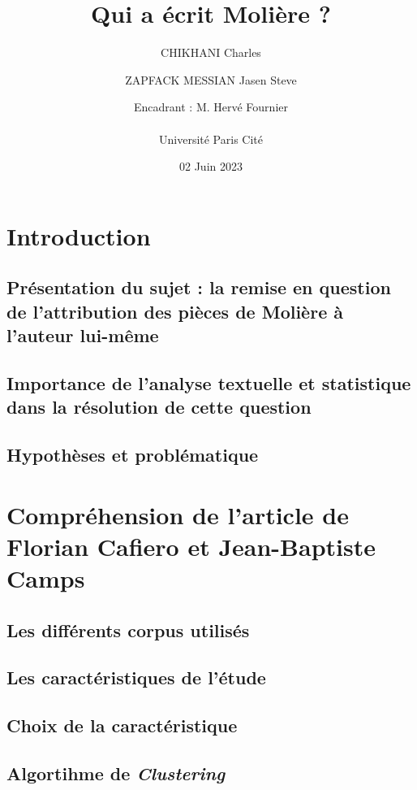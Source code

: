 \documentclass{report} %
\title{Qui a écrit Molière ?}
\author{CHIKHANI Charles \and ZAPFACK MESSIAN Jasen Steve \\ \and Encadrant : M. Hervé Fournier\\ \\ Université Paris Cité}
\date{02 Juin 2023}
\begin{document}
\maketitle
\tableofcontents

\newpage

\section{Introduction}

\vspace{\baselineskip}
\subsection{Présentation du sujet : la remise en question de l'attribution des pièces de Molière à l'auteur lui-même}

\subsection{Importance de l'analyse textuelle et statistique dans la résolution de cette question}

\subsection{Hypothèses et problématique}


\section{Compréhension de l'article de Florian Cafiero et Jean-Baptiste Camps}

\subsection{Les différents corpus utilisés}

\subsection{Les caractéristiques de l'étude}

\subsection{Choix de la caractéristique}

\subsection{Algortihme de \textit{Clustering}}

\end{document}
